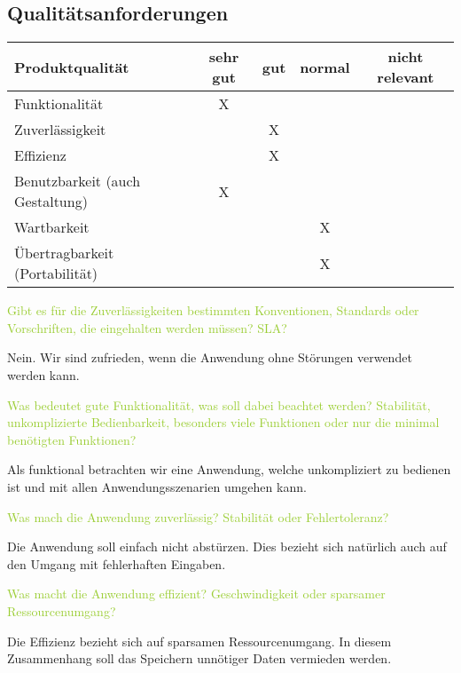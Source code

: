 \subsection{Qualitätsanforderungen}

\begin{center}
    \begin{tabular} {l | c | c | c | c}
        \hline
        Produktqualität & sehr gut & gut & normal & nicht relevant \\
        \hline
        Funktionalität & X & & & \\
        \hline
        Zuverlässigkeit & & X & & \\
        \hline
        Effizienz & & X & & \\
        \hline
        Benutzbarkeit (auch Gestaltung) & X & & & \\
        \hline
        Wartbarkeit & & & X & \\
        \hline
        Übertragbarkeit (Portabilität) & & & X & \\
        \hline
    \end{tabular}
\end{center}

\textcolor{YellowGreen}{Gibt es für die Zuverlässigkeiten bestimmten Konventionen, Standards oder Vorschriften, die eingehalten werden müssen? SLA?}

\textcolor{NavyBlue}{Nein. Wir sind zufrieden, wenn die Anwendung ohne Störungen verwendet werden kann.}

\textcolor{YellowGreen}{Was bedeutet gute Funktionalität, was soll dabei beachtet werden? Stabilität, unkomplizierte Bedienbarkeit, besonders viele Funktionen oder nur die minimal benötigten Funktionen?}

\textcolor{NavyBlue}{Als funktional betrachten wir eine Anwendung, welche unkompliziert zu bedienen ist und mit allen Anwendungsszenarien umgehen kann.}


\textcolor{YellowGreen}{Was mach die Anwendung zuverlässig? Stabilität oder Fehlertoleranz?}

\textcolor{NavyBlue}{Die Anwendung soll einfach nicht abstürzen. Dies bezieht sich natürlich auch auf den Umgang mit fehlerhaften Eingaben.}


\textcolor{YellowGreen}{Was macht die Anwendung effizient? Geschwindigkeit oder sparsamer Ressourcenumgang?}

\textcolor{NavyBlue}{Die Effizienz bezieht sich auf sparsamen Ressourcenumgang. In diesem Zusammenhang soll das Speichern unnötiger Daten vermieden werden.}


